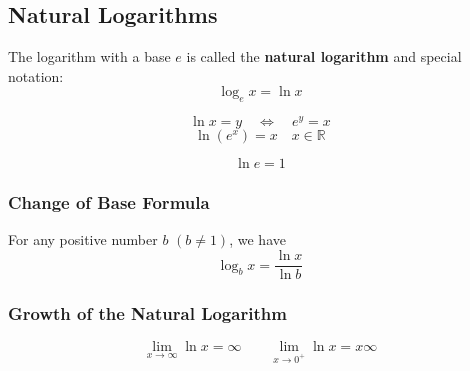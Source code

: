 \subsection*{Natural Logarithms}

The logarithm with a base \(e\) is called the \textbf{natural logarithm} and special notation:
\[ \log_e x = \ln x \]

\[ \ln x = y \quad \Leftrightarrow \quad e^y = x \]
\[ \ln(e^x) = x \quad x \in \mathbb{R} \]

\[ \ln e = 1 \]

\subsubsection*{Change of Base Formula}

For any positive number \(b\) \((b \neq 1)\), we have 
\[ \log_b x = \frac{\ln x}{\ln b} \] 

\subsubsection*{Growth of the Natural Logarithm}

\[ \lim_{x \to \infty} \ln x = \infty \quad \quad \lim_{x \to 0^+} \ln x = x \infty \]
